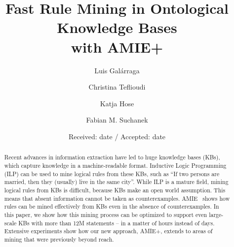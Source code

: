 \title{Fast Rule Mining in Ontological Knowledge Bases\\ with AMIE+}


\author{Luis Gal\'arraga\and
        Christina Teflioudi \and Katja Hose \and Fabian M. Suchanek
}



\date{Received: date / Accepted: date}


\maketitle

\begin{abstract}
Recent advances in information extraction have led to huge knowledge bases (KBs), which capture knowledge in a ma\-chine-readable format.
Inductive Logic Programming (ILP) can be used to mine logical rules from these KBs, such as ``If two persons are married, then they (usually) live in the same city''.
While ILP is a mature field, mining logical rules from KBs is difficult, because KBs make an open world assumption.
This means that absent information cannot be taken as counterexamples.
AMIE~\cite{amie} shows how rules can be mined effectively from KBs even in the absence of counterexamples.
In this paper, we show how this mining process can be optimized to support even large-scale KBs with more than 12M statements -- in a matter of hours instead of days.
Extensive experiments show how our new approach, AMIE+, extends to areas of mining that were previously beyond reach.
\end{abstract}


